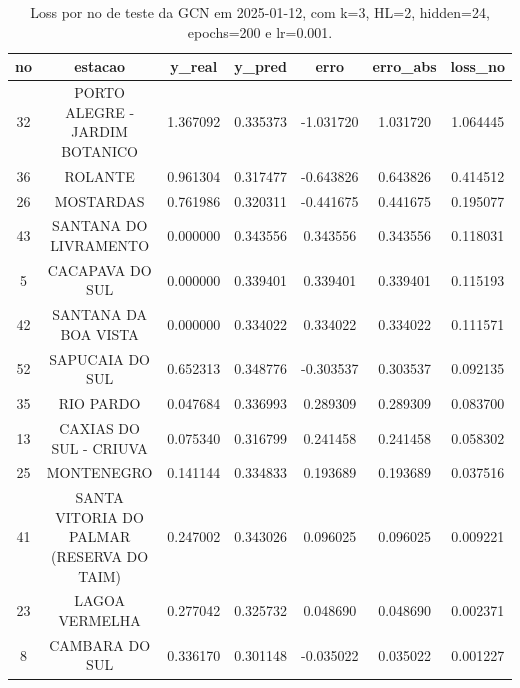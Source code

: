 \begin{table}[h]
\centering
\caption{Loss por no de teste da GCN em 2025-01-12, com k=3, HL=2, hidden=24, epochs=200 e lr=0.001.}
\label{tab:gcn_loss_k3_hl2_h24_e200_d20250112}
\begin{tabular}{ccccccc}
\toprule
no & estacao & y\_real & y\_pred & erro & erro\_abs & loss\_no \\
\midrule
32 & PORTO ALEGRE - JARDIM BOTANICO & 1.367092 & 0.335373 & -1.031720 & 1.031720 & 1.064445 \\
36 & ROLANTE & 0.961304 & 0.317477 & -0.643826 & 0.643826 & 0.414512 \\
26 & MOSTARDAS & 0.761986 & 0.320311 & -0.441675 & 0.441675 & 0.195077 \\
43 & SANTANA DO LIVRAMENTO & 0.000000 & 0.343556 & 0.343556 & 0.343556 & 0.118031 \\
5 & CACAPAVA DO SUL & 0.000000 & 0.339401 & 0.339401 & 0.339401 & 0.115193 \\
42 & SANTANA DA BOA VISTA & 0.000000 & 0.334022 & 0.334022 & 0.334022 & 0.111571 \\
52 & SAPUCAIA DO SUL & 0.652313 & 0.348776 & -0.303537 & 0.303537 & 0.092135 \\
35 & RIO PARDO & 0.047684 & 0.336993 & 0.289309 & 0.289309 & 0.083700 \\
13 & CAXIAS DO SUL - CRIUVA & 0.075340 & 0.316799 & 0.241458 & 0.241458 & 0.058302 \\
25 & MONTENEGRO & 0.141144 & 0.334833 & 0.193689 & 0.193689 & 0.037516 \\
41 & SANTA VITORIA DO PALMAR (RESERVA DO TAIM) & 0.247002 & 0.343026 & 0.096025 & 0.096025 & 0.009221 \\
23 & LAGOA VERMELHA & 0.277042 & 0.325732 & 0.048690 & 0.048690 & 0.002371 \\
8 & CAMBARA DO SUL & 0.336170 & 0.301148 & -0.035022 & 0.035022 & 0.001227 \\
\bottomrule
\end{tabular}
\end{table}
